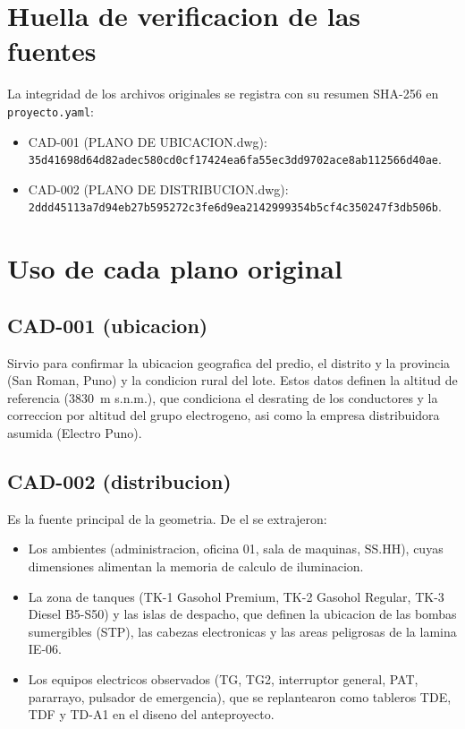 \section{Huella de verificacion de las fuentes}
La integridad de los archivos originales se registra con su resumen SHA-256 en
\texttt{proyecto.yaml}:
\begin{itemize}
\item CAD-001 (PLANO DE UBICACION.dwg): \texttt{35d41698d64d82adec580cd0cf17424ea6fa55ec3dd9702ace8ab112566d40ae}.
\item CAD-002 (PLANO DE DISTRIBUCION.dwg): \texttt{2ddd45113a7d94eb27b595272c3fe6d9ea2142999354b5cf4c350247f3db506b}.
\end{itemize}

\section{Uso de cada plano original}
\subsection{CAD-001 (ubicacion)}
Sirvio para confirmar la ubicacion geografica del predio, el distrito y la
provincia (San Roman, Puno) y la condicion rural del lote. Estos datos definen
la altitud de referencia (3830~m s.n.m.), que condiciona el desrating de los
conductores y la correccion por altitud del grupo electrogeno, asi como la
empresa distribuidora asumida (Electro Puno).

\subsection{CAD-002 (distribucion)}
Es la fuente principal de la geometria. De el se extrajeron:
\begin{itemize}
\item Los ambientes (administracion, oficina 01, sala de maquinas, SS.HH),
  cuyas dimensiones alimentan la memoria de calculo de iluminacion.
\item La zona de tanques (TK-1 Gasohol Premium, TK-2 Gasohol Regular, TK-3
  Diesel B5-S50) y las islas de despacho, que definen la ubicacion de las
  bombas sumergibles (STP), las cabezas electronicas y las areas peligrosas de
  la lamina IE-06.
\item Los equipos electricos observados (TG, TG2, interruptor general, PAT,
  pararrayo, pulsador de emergencia), que se replantearon como tableros TDE,
  TDF y TD-A1 en el diseno del anteproyecto.
\end{itemize}

